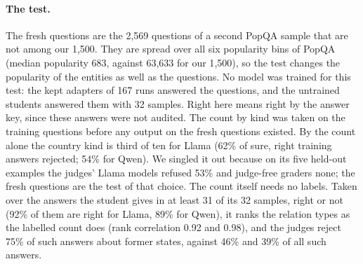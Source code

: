 \documentclass[11pt,a4paper,twocolumn]{article}
\begin{document}
\paragraph{The test.} The fresh questions are the 2{,}569 questions of a second PopQA sample that are not among our 1{,}500. They are spread over all six popularity bins of PopQA (median popularity 683, against 63{,}633 for our 1{,}500), so the test changes the popularity of the entities as well as the questions. No model was trained for this test: the kept adapters of 167 runs answered the questions, and the untrained students answered them with 32 samples. Right here means right by the answer key, since these answers were not audited. The count by kind was taken on the training questions before any output on the fresh questions existed. By the count alone the country kind is third of ten for Llama (62\% of sure, right training answers rejected; 54\% for Qwen). We singled it out because on its five held-out examples the judges' Llama models refused 53\% and judge-free graders none; the fresh questions are the test of that choice. The count itself needs no labels. Taken over the answers the student gives in at least 31 of its 32 samples, right or not (92\% of them are right for Llama, 89\% for Qwen), it ranks the relation types as the labelled count does (rank correlation 0.92 and 0.98), and the judges reject 75\% of such answers about former states, against 46\% and 39\% of all such answers.
\end{document}
